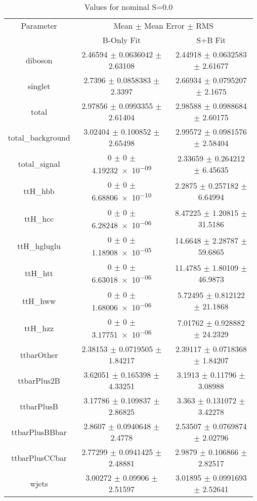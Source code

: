 \begin{table}
\centering
\caption{Values for nominal S=0.0}
\begin{tabular}{ccc}
\toprule
Parameter & \multicolumn{2}{c}{Mean $\pm$ Mean Error $\pm$ RMS}\\
 & B-Only Fit & S+B Fit\\
\midrule
diboson & \num{2.46594} $\pm$ \num{0.0636042} $\pm$ \num{2.63108} & \num{2.44918} $\pm$ \num{0.0632583} $\pm$ \num{2.61677}\\
singlet & \num{2.7396} $\pm$ \num{0.0858383} $\pm$ \num{2.3397} & \num{2.66934} $\pm$ \num{0.0795207} $\pm$ \num{2.1675}\\
total & \num{2.97856} $\pm$ \num{0.0993355} $\pm$ \num{2.61404} & \num{2.98588} $\pm$ \num{0.0988684} $\pm$ \num{2.60175}\\
total\_background & \num{3.02404} $\pm$ \num{0.100852} $\pm$ \num{2.65498} & \num{2.99572} $\pm$ \num{0.0981576} $\pm$ \num{2.58404}\\
total\_signal & \num{0} $\pm$ \num{0} $\pm$ \num{4.19232e-09} & \num{2.33659} $\pm$ \num{0.264212} $\pm$ \num{6.45635}\\
ttH\_hbb & \num{0} $\pm$ \num{0} $\pm$ \num{6.68806e-10} & \num{2.2875} $\pm$ \num{0.257182} $\pm$ \num{6.64994}\\
ttH\_hcc & \num{0} $\pm$ \num{0} $\pm$ \num{6.28248e-06} & \num{8.47225} $\pm$ \num{1.20815} $\pm$ \num{31.5186}\\
ttH\_hgluglu & \num{0} $\pm$ \num{0} $\pm$ \num{1.18908e-05} & \num{14.6648} $\pm$ \num{2.28787} $\pm$ \num{59.6865}\\
ttH\_htt & \num{0} $\pm$ \num{0} $\pm$ \num{6.63018e-06} & \num{11.4785} $\pm$ \num{1.80109} $\pm$ \num{46.9873}\\
ttH\_hww & \num{0} $\pm$ \num{0} $\pm$ \num{1.68006e-06} & \num{5.72495} $\pm$ \num{0.812122} $\pm$ \num{21.1868}\\
ttH\_hzz & \num{0} $\pm$ \num{0} $\pm$ \num{3.17751e-06} & \num{7.01762} $\pm$ \num{0.928882} $\pm$ \num{24.2329}\\
ttbarOther & \num{2.38153} $\pm$ \num{0.0719505} $\pm$ \num{1.84217} & \num{2.39117} $\pm$ \num{0.0718368} $\pm$ \num{1.84207}\\
ttbarPlus2B & \num{3.62051} $\pm$ \num{0.165398} $\pm$ \num{4.33251} & \num{3.1913} $\pm$ \num{0.11796} $\pm$ \num{3.08988}\\
ttbarPlusB & \num{3.17786} $\pm$ \num{0.109837} $\pm$ \num{2.86825} & \num{3.363} $\pm$ \num{0.131072} $\pm$ \num{3.42278}\\
ttbarPlusBBbar & \num{2.8607} $\pm$ \num{0.0940648} $\pm$ \num{2.4778} & \num{2.53507} $\pm$ \num{0.0769874} $\pm$ \num{2.02796}\\
ttbarPlusCCbar & \num{2.77299} $\pm$ \num{0.0941425} $\pm$ \num{2.48881} & \num{2.9879} $\pm$ \num{0.106866} $\pm$ \num{2.82517}\\
wjets & \num{3.00272} $\pm$ \num{0.09906} $\pm$ \num{2.51597} & \num{3.01895} $\pm$ \num{0.0991693} $\pm$ \num{2.52641}\\
\bottomrule
\end{tabular}
\end{table}